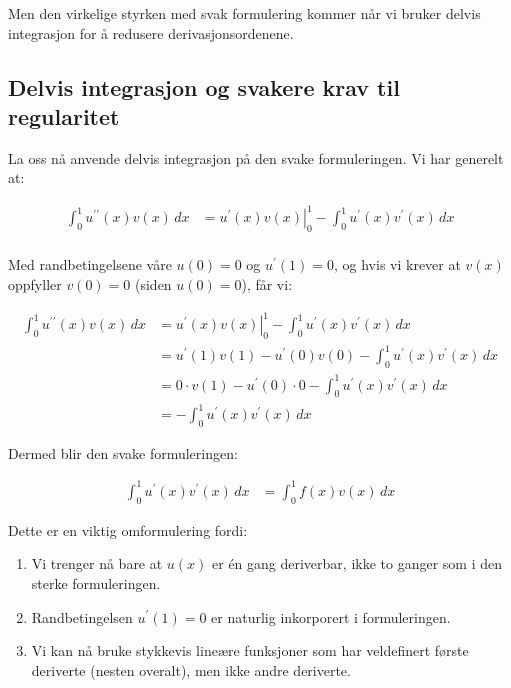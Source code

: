 Men den virkelige styrken med svak formulering kommer når vi bruker delvis integrasjon for å redusere derivasjonsordenene.

\subsection{Delvis integrasjon og svakere krav til regularitet}

La oss nå anvende delvis integrasjon på den svake formuleringen.
Vi har generelt at:

\begin{align*}
	\int_0^1 u^{\prime\prime}(x) v(x) \, dx & = \left. u^{\prime}(x) v(x) \right|_{0}^{1} - \int_0^1 u^{\prime}(x) v^{\prime}(x) \, dx \\
\end{align*}

Med randbetingelsene våre $u(0) = 0$ og $u^{\prime}(1) = 0$, og hvis vi krever at $v(x)$ oppfyller $v(0) = 0$ (siden $u(0) = 0$), får vi:

\begin{align*}
	\int_0^1 u^{\prime\prime}(x) v(x) \, dx & = \left. u^{\prime}(x) v(x) \right|_{0}^{1} - \int_0^1 u^{\prime}(x) v^{\prime}(x) \, dx \\
	                                        & = u^{\prime}(1) v(1) - u^{\prime}(0) v(0) - \int_0^1 u^{\prime}(x) v^{\prime}(x) \, dx   \\
	                                        & = 0 \cdot v(1) - u^{\prime}(0) \cdot 0 - \int_0^1 u^{\prime}(x) v^{\prime}(x) \, dx      \\
	                                        & = - \int_0^1 u^{\prime}(x) v^{\prime}(x) \, dx
\end{align*}

Dermed blir den svake formuleringen:

\begin{align*}
	\int_0^1 u^{\prime}(x) v^{\prime}(x) \, dx & = \int_0^1 f(x) v(x) \, dx
\end{align*}

Dette er en viktig omformulering fordi:

\begin{enumerate}
	\item Vi trenger nå bare at $u(x)$ er én gang deriverbar, ikke to ganger som i den sterke formuleringen.
	\item Randbetingelsen $u^{\prime}(1) = 0$ er naturlig inkorporert i formuleringen.
	\item Vi kan nå bruke stykkevis lineære funksjoner som har veldefinert første deriverte (nesten overalt), men ikke andre deriverte.
\end{enumerate}

